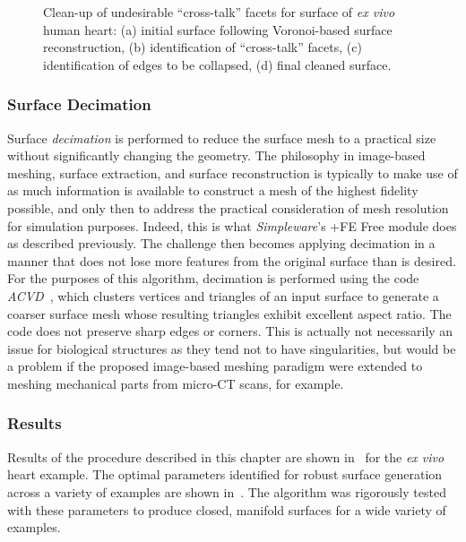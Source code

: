 \begin{figure}[ht]
{\label{fig:cross2-4}}		
%
\caption{Clean-up of undesirable ``cross-talk'' facets for surface of \textit{ex vivo} human heart: (a) initial surface following Voronoi-based surface reconstruction, (b) identification of ``cross-talk'' facets, (c) identification of edges to be collapsed, (d) final cleaned surface.}
\label{fig:cross2}
\end{figure}

\subsubsection{Surface Decimation}

Surface \textit{decimation} is performed to reduce the surface mesh to a practical size without significantly changing the geometry. The philosophy in image-based meshing, surface extraction, and surface reconstruction is typically to make use of as much information is available to construct a mesh of the highest fidelity possible, and only then to address the practical consideration of mesh resolution for simulation purposes. Indeed, this is what \textit{Simpleware}'s {+FE Free} module does as described previously. The challenge then becomes applying decimation in a manner that does not lose more features from the original surface than is desired. For the purposes of this algorithm, decimation is performed using the code \textit{ACVD}~\cite{valette_2004, valette_2008}, which clusters vertices and triangles of an input surface to generate a coarser surface mesh whose resulting triangles exhibit excellent aspect ratio. The code does not preserve sharp edges or corners. This is actually not necessarily an issue for biological structures as they tend not to have singularities, but would be a problem if the proposed image-based meshing paradigm were extended to meshing mechanical parts from micro-CT scans, for example.

\subsubsection{Results}

Results of the procedure described in this chapter are shown in~ for the \textit{ex vivo} heart example. The optimal parameters identified for robust surface generation across a variety of examples are shown in~. The algorithm was rigorously tested with these parameters to produce closed, manifold surfaces for a wide variety of examples.


